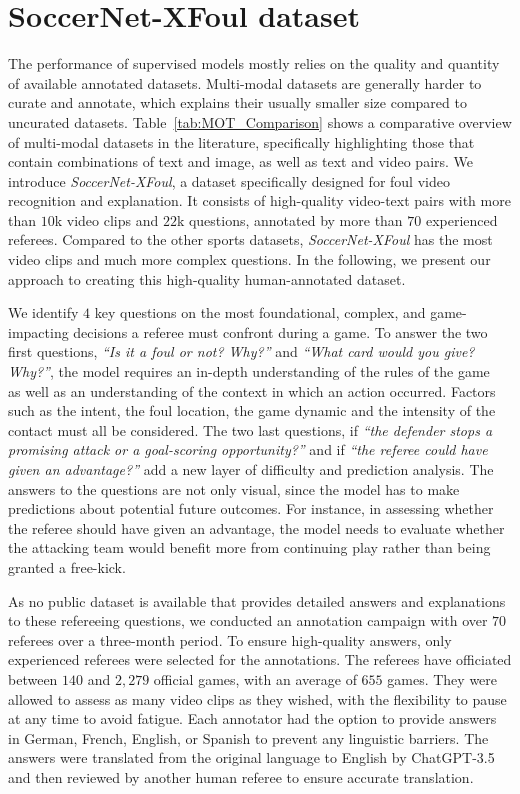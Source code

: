 \section{SoccerNet-XFoul dataset}
\label{sec:dataset}

The performance of supervised models mostly relies on the quality and quantity of available annotated datasets. Multi-modal datasets are generally harder to curate and annotate, which explains their usually smaller size compared to uncurated datasets.
Table~\ref{tab:MOT_Comparison} shows a comparative overview of multi-modal datasets in the literature, specifically highlighting those that contain combinations of text and image, as well as text and video pairs.
We introduce \emph{SoccerNet-XFoul}, a dataset specifically designed for foul video recognition and explanation. 
It consists of high-quality video-text pairs with more than $10$k video clips and $22$k questions, annotated by more than $70$ experienced referees. 
Compared to the other sports datasets, \textit{SoccerNet-XFoul} has the most video clips and much more complex questions. 
In the following, we present our approach to creating this high-quality human-annotated dataset.

We identify $4$ key questions on the most foundational, complex, and game-impacting decisions a referee must confront during a game.
To answer the two first questions,
\textit{``Is it a foul or not? Why?''} and \textit{``What card would you give? Why?''}, the model requires an in-depth understanding of the rules of the game~\cite{IFAB2022Laws} as well as an understanding of the context in which an action occurred. Factors such as the intent, the foul location, the game dynamic and the intensity of the contact must all be considered.
The two last questions, if \textit{``the defender stops a promising attack or a goal-scoring opportunity?''} and if \textit{``the referee could have given an advantage?''} add a new layer of difficulty and prediction analysis. The answers to the questions are not only visual, since the model has to make predictions about potential future outcomes. 
For instance, in assessing whether the referee should have given an advantage, the model needs to evaluate whether the attacking team would benefit more from continuing play rather than being granted a free-kick.

As no public dataset is available that provides detailed answers and explanations to these refereeing questions, we conducted an annotation campaign with over $70$ referees over a three-month period.
To ensure high-quality answers, only experienced referees were selected for the annotations. 
The referees have officiated between $140$ and $2{,}279$ official games, with an average of $655$ games.
They were allowed to assess as many video clips as they wished, with the flexibility to pause at any time to avoid fatigue.
Each annotator had the option to provide answers in German, French, English, or Spanish to prevent any linguistic barriers.
The answers were translated from the original language to English by ChatGPT-3.5~\cite{Brown2020Language-arxiv} and then reviewed by another human referee to ensure accurate translation.

